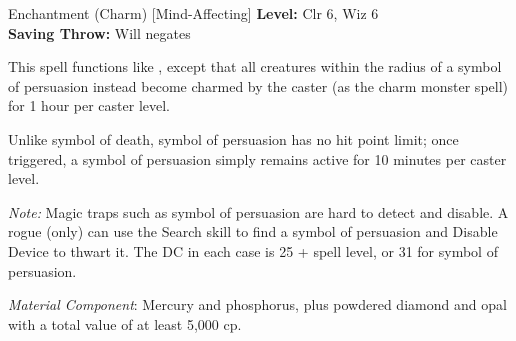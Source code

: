 {Enchantment (Charm) [Mind-Affecting]}
{
	\textbf{Level:}
	Clr 6, Wiz 6\\
	\textbf{Saving Throw:}
	Will negates\\
}
{
	This spell functions like , except that all creatures within the radius of a symbol of persuasion instead become charmed by the caster (as the charm monster spell) for 1 hour per caster level.

	Unlike symbol of death, symbol of persuasion has no hit point limit; once triggered, a symbol of persuasion simply remains active for 10 minutes per caster level.

	\textit{Note:} Magic traps such as symbol of persuasion are hard to detect and disable. A rogue (only) can use the Search skill to find a symbol of persuasion and Disable Device to thwart it. The DC in each case is 25 + spell level, or 31 for symbol of persuasion.

	\textit{Material Component}:
	Mercury and phosphorus, plus powdered diamond and opal with a total value of at least 5,000 cp.

}
